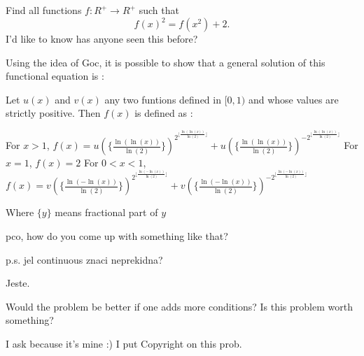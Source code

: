 \begin{mysolution}
	\begin{tcolorbox}Find all functions $f: R^{+}\to R^{+}$ such that
\[f(x)^{2}=f(x^{2})+2. \]
I'd like to know has anyone seen this before?\end{tcolorbox}

Using the idea of Goc, it is possible to show that a general solution of this functional equation is :

Let $u(x)$ and $v(x)$ any two funtions defined in $[0,1)$ and whose values are strictly positive. Then $f(x)$ is defined as :

For $x>1$, $f(x)=u(\{\frac{\ln(\ln(x))}{\ln(2)}\})^{2^{\lfloor\frac{\ln(\ln(x))}{\ln(2)}\rfloor}}+u(\{\frac{\ln(\ln(x))}{\ln(2)}\})^{-2^{\lfloor\frac{\ln(\ln(x))}{\ln(2)}\rfloor}}$
For $x=1$, $f(x)=2$
For $0<x<1$, $f(x)=v(\{\frac{\ln(-\ln(x))}{\ln(2)}\})^{2^{\lfloor\frac{\ln(-\ln(x))}{\ln(2)}\rfloor}}+v(\{\frac{\ln(-\ln(x))}{\ln(2)}\})^{-2^{\lfloor\frac{\ln(-\ln(x))}{\ln(2)}\rfloor}}$

Where $\{y\}$ means fractional part of $y$
\end{mysolution}



\begin{mysolution}
	pco, how do you come up with something like that?
\end{mysolution}



\begin{mysolution}
	\begin{tcolorbox}p.s. jel continuous znaci neprekidna?\end{tcolorbox}

Jeste.
\end{mysolution}



\begin{mysolution}
	Would the problem be better if one adds more conditions?
Is this problem worth something?

I ask because it's mine :) I put Copyright on this prob.
\end{mysolution}



